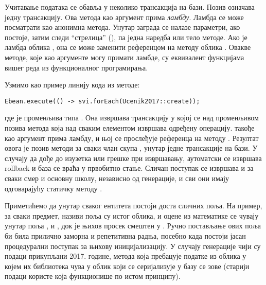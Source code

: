 Учитавање података се обавља у неколико трансакција на бази. Позив  означава једну трансакцију. Oва метода као аргумент прима \emph{ламбду}. Ламбда се може посматрати као анонимна метода. Унутар заграда се налазе параметри, ако постоје, затим следи \enquote{стрелица} (\code{->}), па једна наредба или тело методе. Ако је ламбда облика , она се може заменити референцом на методу облика . Овакве методе, које као аргументе могу примати ламбде, су еквивалент функцијама вишег реда из функционалног програмирања.

Узмимо као пример линију кода из  методе: 
\begin{verbatim}
Ebean.execute(() -> svi.forEach(Ucenik2017::create));
\end{verbatim}
где је  променљива типа . Она извршава трансакцију у којој се над променљивом  позива метода  која над сваким елементом извршава одређену операцију.  такође као аргумент прима ламбду, и њој се прослеђује референца на методу . Резултат овога је позив методи  за сваки члан скупа , унутар једне трансакције на бази. У случају да дође до изузетка или грешке при извршавању, аутоматски се извршава rollback и база се враћа у првобитно стање. Сличан поступак се извршава и за сваки смер и основну школу, независно од генерације, и сви они имају одговарајућу статичку методу .

Приметићемо да унутар сваког ентитета постоји доста сличних поља. На пример, за сваки предмет, називи поља су истог облика, и оцене из математике се чувају унутар поља ,  и , док је њихов просек смештен у . Ручно постављање ових поља би била прилично заморна и репетитивна радња, посебно када постоји јасан процедурални поступак за њихову иницијализацију. У случају генерације чији су подаци прикупљани 2017. године, метода која пребацује податке из облика у којем их библиотека чува у облик који се серијализује у базу се зове  (старији подаци користе  која функционише по истом принципу).

